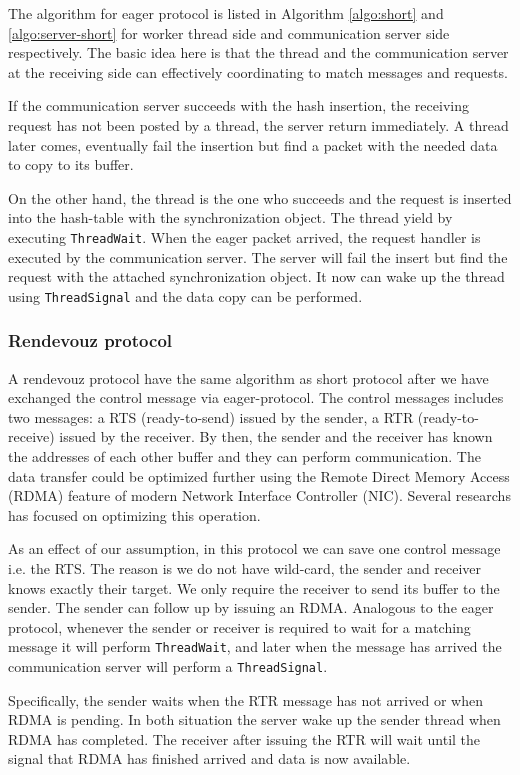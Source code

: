 \documentclass{sig-alternate-05-2015}
\begin{document}
The algorithm for eager protocol is listed in Algorithm \ref{algo:short} and
\ref{algo:server-short} for worker thread side and communication server side
respectively. The basic idea here is that the thread and the communication
server at the receiving side can effectively coordinating to match messages and
requests.

If the communication server succeeds with the hash insertion, the receiving
request has not been posted by a thread, the server return immediately. A
thread later comes, eventually fail the insertion but find a packet
with the needed data to copy to its buffer.

On the other hand, the thread is the one who succeeds and the request is
inserted into the hash-table with the synchronization object. The thread yield
by executing \texttt{ThreadWait}. When the eager packet arrived, the
request handler is executed by the communication server. The server will fail
the insert but find the request with the attached synchronization object. It
now can wake up the thread using \texttt{ThreadSignal} and the data copy can
be performed.

\subsubsection{Rendevouz protocol}
A rendevouz protocol have the same algorithm as short protocol after we have
exchanged the control message via eager-protocol. The control messages 
includes two messages: a RTS (ready-to-send) issued by the sender, a RTR
(ready-to-receive) issued by the receiver. By then, the sender and the receiver
has known the addresses of each other buffer and they can perform
communication.  The data transfer could be optimized further using the
Remote Direct Memory Access (RDMA) feature of modern Network Interface
Controller (NIC).  Several researchs has focused on optimizing this operation.

As an effect of our assumption, in this protocol we can save one control
message i.e. the RTS.  The reason is we do not have wild-card, the sender and
receiver knows exactly their target.  We only require the receiver to send its
buffer to the sender. The sender can follow up by issuing an RDMA.  Analogous
to the eager protocol, whenever the sender or receiver is required to wait for
a matching message it will perform \texttt{ThreadWait}, and later when the
message has arrived the communication server will perform a
\texttt{ThreadSignal}.

Specifically, the sender waits when the RTR message has not arrived or when
RDMA is pending. In both situation the server wake up the sender thread when
RDMA has completed. The receiver after issuing the RTR will wait until the
signal that RDMA has finished arrived and data is now available.
\end{document}
